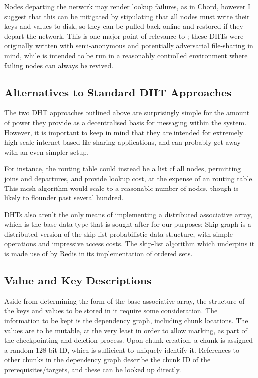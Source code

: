 Nodes departing the network may render lookup failures, as in Chord, however I suggest that this can be mitigated by stipulating that all nodes must write their keys and values to disk, so they can be pulled back online and restored if they depart the network.
This is one major point of relevance to \lsr{}; these DHTs were originally written with semi-anonymous and potentially adversarial file-sharing in mind, while \lsr{} is intended to be run in a reasonably controlled environment where failing nodes can always be revived.

\subsection{Alternatives to Standard DHT Approaches}

The two DHT approaches outlined above are surprisingly simple for the amount of power they provide as a decentralised basis for messaging within the system.
However, it is important to keep in mind that they are intended for extremely high-scale internet-based file-sharing applications, and \lsr{} can probably get away with an even simpler setup.

For instance, the routing table could instead be a list of all nodes, permitting joins and departures, and provide  lookup cost, at the expense of an  routing table.
This mesh algorithm would scale to a reasonable number of nodes, though is likely to flounder past several hundred.

DHTs also aren't the only means of implementing a distributed associative array, which is the base data type that is sought after for our purposes; Skip graph is a distributed version of the skip-list probabilistic data structure, with simple operations and impressive access costs\cite{aspnes2007skipgraph}.
The skip-list algorithm which underpins it is made use of by Redis in its implementation of ordered sets.

\subsection{Value and Key Descriptions}

Aside from determining the form of the base associative array, the structure of the keys and values to be stored in it require some consideration.
The information to be kept is the dependency graph, including chunk locations.
The values are to be mutable, at the very least in order to allow marking, as part of the checkpointing and deletion process.
Upon chunk creation, a chunk is assigned a random 128 bit ID, which is sufficient to uniquely identify it.
References to other chunks in the dependency graph describe the chunk ID of the prerequisites/targets, and these can be looked up directly.

